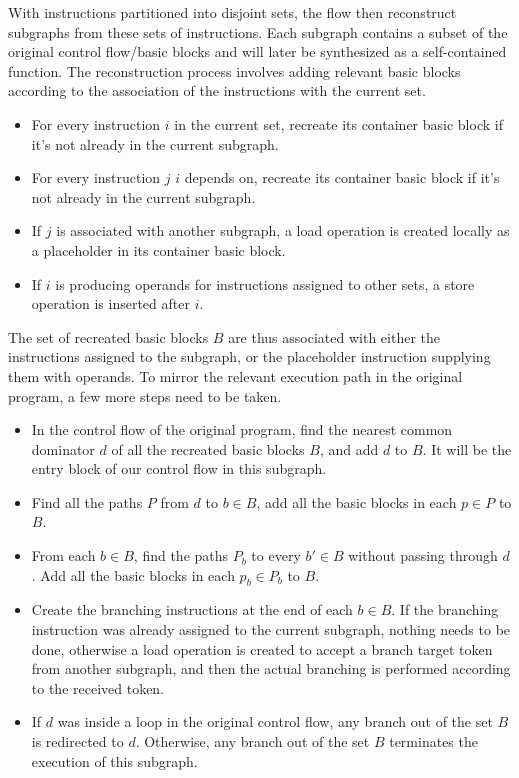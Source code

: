With instructions partitioned into disjoint sets, the flow then
reconstruct subgraphs from these sets of instructions. Each subgraph
contains a subset of the original control flow/basic blocks and 
will later be synthesized as a self-contained function. The reconstruction process involves adding relevant basic blocks according to the
association of the instructions with the current set.
\begin{itemize}
    \item For every instruction $i$  in the current set, recreate
    its container basic block if it's not already in the current subgraph.
    \item For every instruction $j$  $i$ depends on, 
    recreate its container basic block if it's not already
    in the current subgraph.
    \item If $j$ is associated with another subgraph, a load operation
    is created locally as a placeholder in its container basic block.
    \item If $i$ is producing operands for instructions assigned to 
    other sets, a store operation is inserted after $i$.
\end{itemize}
The set of recreated basic blocks $B$ are thus associated with either the instructions
assigned to the subgraph, or the placeholder instruction supplying them with operands. To mirror the relevant execution path in the original program, a few more steps need to be taken.
\begin{itemize}
    \item In the control flow of the original program, find the nearest common dominator $d$ of all the recreated basic blocks $B$, and add $d$ to $B$. It will be the entry block of our
    control flow in this subgraph.
    
    \item Find all the paths $P$ from $d$ to $b \in B$, add all the 
    basic blocks in each $p \in P$ to $B$.
    \item From each $b \in B$, find the paths $P_b$ to every $b' \in B$ without passing through $d$. Add all the basic blocks in each $p_b \in P_b$ to $B$. \item Create the branching instructions at the end of each $b \in B$. If the branching instruction was already assigned to the current subgraph, nothing needs to be done, otherwise a load operation is created to accept
    a branch target token from another subgraph, and then the actual branching is performed according to the received token. 
    \item If $d$ was inside a loop in the original control flow, any branch out of the set $B$ is redirected to $d$. Otherwise, any branch out of the set $B$ terminates the execution of this subgraph.
\end{itemize}


